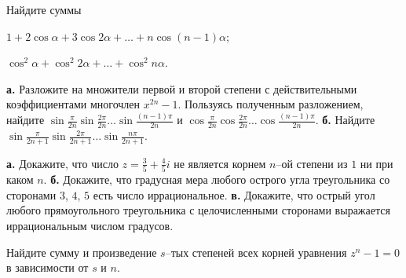 \documentclass[a4paper, 12pt, num=22]{listok}
\begin{document}
\begin{problem}
	Найдите суммы
	\begin{enumerate}
	\begin{multicols}{2}
		\item $1 + 2 \cos \alpha + 3 \cos{2\alpha} + \dots + n \cos{(n−1)\alpha}$;
		\item $\cos^2 \alpha + \cos^2 {2\alpha} + \dots + \cos^2 {n\alpha}$.
	\end{multicols}
	\end{enumerate}
\end{problem}
\begin{problem}
	\textbf{а.} Разложите на множители первой и второй степени с действительными коэффициентами многочлен $x^{2n} - 1$.
	Пользуясь полученным разложением, найдите $\sin{\frac{\pi}{2n}}\sin{\frac{2\pi}{2n}}\dots\sin{\frac{(n - 1)\pi}{2n}}$ и
	$\cos{\frac{\pi}{2n}}\cos{\frac{2\pi}{2n}}\dots\cos{\frac{(n - 1)\pi}{2n}}$.
	\textbf{б.} Найдите $\sin{\frac{\pi}{2n + 1}}\sin{\frac{2\pi}{2n + 1}}\dots\sin{\frac{n\pi}{2n + 1}}$.
\end{problem}
\begin{problem}
	\textbf{а.} Докажите, что число $z = \frac35 + \frac45 i$ не является корнем $n$--ой степени из $1$ ни при каком $n$.
	\textbf{б.} Докажите, что градусная мера любого острого угла треугольника со сторонами $3$, $4$, $5$ есть число иррациональное.
	\textbf{в.} Докажите, что острый угол любого прямоугольного треугольника с целочисленными сторонами выражается иррациональным числом градусов.
\end{problem}
\begin{problem}
	Найдите сумму и произведение $s$--тых степеней всех корней уравнения $z^n -1 = 0$ в зависимости от $s$ и $n$.
\end{problem}
\end{document}
